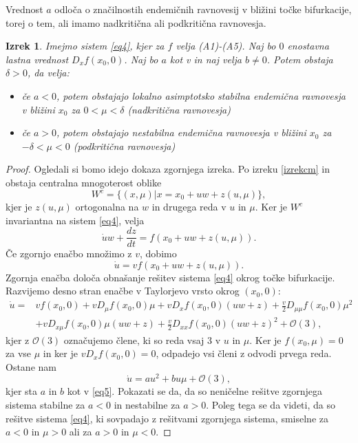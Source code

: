 \documentclass[a4paper,12pt]{article}
\newtheorem{izrek}{Izrek}
\begin{document}
Vrednost \(a\) odloča o značilnostih endemičnih ravnovesij v bližini točke bifurkacije, 
torej o tem, ali imamo nadkritična ali podkritična ravnovesja. 

\begin{izrek}\label{izrek2}
    Imejmo sistem \ref{eq4}, kjer za \(f\) velja (A1)-(A5). Naj bo \(0\) enostavna
    lastna vrednost \(D_xf(x_0,0)\). Naj bo \(a\) kot v \label{eq5} in naj velja \(b\neq 0\).
    Potem obstaja \(\delta >0\), da velja:
    \begin{itemize}
        \item če \(a<0\), potem obstajajo lokalno asimptotsko stabilna endemična ravnovesja
        v bližini \(x_0\) za \(0<\mu <\delta\) (nadkritična ravnovesja)
        \item če \(a>0\), potem obstajajo nestabilna endemična ravnovesja v bližini \(x_0\) 
        za \(-\delta < \mu < 0\) (podkritična ravnovesja)
    \end{itemize}
\end{izrek}

\begin{proof}
    Ogledali si bomo idejo dokaza zgornjega izreka. 
    Po izreku \ref{izrekcm} in \cite{vir2} obstaja centralna mnogoterost oblike 
    \[W^c=\{(x,\mu)|x=x_0+uw+z(u,\mu)\},\]
    kjer je \(z(u,\mu)\) ortogonalna na \(w\) in drugega reda v \(u\) in \(\mu\). 
    Ker je \(W^c\) invariantna na sistem \ref{eq4}, velja 
    \[\dot{u}w+\frac{dz}{dt}=f(x_0+uw+z(u,\mu)).\]
    Če zgornjo enačbo množimo z \(v\), dobimo 
    \[\dot{u}=vf(x_0+uw+z(u,\mu)).\]
    Zgornja enačba določa obnašanje rešitev sistema \ref{eq4} okrog točke bifurkacije. 
    Razvijemo desno stran enačbe v Taylorjevo vrsto okrog \((x_0,0)\):
    \begin{align*}
    \dot{u}=&vf(x_0,0)+vD_{\mu}f(x_0,0)\mu+vD_xf(x_0,0)(uw+z)+\frac{v}{2}D_{\mu\mu}f(x_0,0)\mu^2\\
    &+vD_{x\mu}f(x_0,0)\mu (uw+z)+\frac{v}{2}D_{xx}f(x_0,0)(uw+z)^2+\mathcal{O}(3),
    \end{align*}
    kjer z \(\mathcal{O}(3)\) označujemo člene, ki so reda vsaj \(3\) v \(u\) in \(\mu\). 
    Ker je \(f(x_0,\mu)=0\) za vse \(\mu\) in ker je \(vD_xf(x_0,0)=0\), odpadejo vsi
    členi z odvodi prvega reda. Ostane nam 
    \[\dot{u}=au^2 + bu\mu +\mathcal{O}(3),\]
    kjer sta \(a\) in \(b\) kot v \ref{eq5}. 
    Pokazati se da, da so neničelne rešitve zgornjega sistema stabilne za \(a<0\) in 
    nestabilne za \(a>0\). Poleg tega se da videti, da so rešitve sistema \ref{eq4},
    ki sovpadajo z rešitvami zgornjega sistema, smiselne za \(a<0\) in \(\mu>0\) ali za \(a>0\) in \(\mu<0\).

\end{proof}
\end{document}

